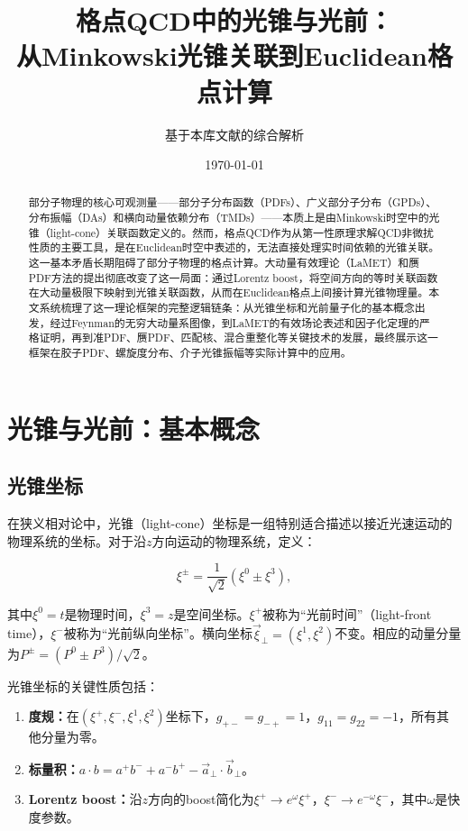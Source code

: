 \documentclass[12pt,a4paper]{ctexart}
\title{\heiti 格点QCD中的光锥与光前：\\
从Minkowski光锥关联到Euclidean格点计算}
\author{基于本库文献的综合解析}
\date{\today}
\theoremstyle{definition}
\begin{document}
\maketitle

\begin{abstract}
\noindent
部分子物理的核心可观测量——部分子分布函数（PDFs）、广义部分子分布（GPDs）、分布振幅（DAs）和横向动量依赖分布（TMDs）——本质上是由Minkowski时空中的光锥（light-cone）关联函数定义的。然而，格点QCD作为从第一性原理求解QCD非微扰性质的主要工具，是在Euclidean时空中表述的，无法直接处理实时间依赖的光锥关联。这一基本矛盾长期阻碍了部分子物理的格点计算。大动量有效理论（LaMET）和赝PDF方法的提出彻底改变了这一局面：通过Lorentz boost，将空间方向的等时关联函数在大动量极限下映射到光锥关联函数，从而在Euclidean格点上间接计算光锥物理量。本文系统梳理了这一理论框架的完整逻辑链条：从光锥坐标和光前量子化的基本概念出发，经过Feynman的无穷大动量系图像，到LaMET的有效场论表述和因子化定理的严格证明，再到准PDF、赝PDF、匹配核、混合重整化等关键技术的发展，最终展示这一框架在胶子PDF、螺旋度分布、介子光锥振幅等实际计算中的应用。
\end{abstract}

\tableofcontents
\newpage

\section{光锥与光前：基本概念}

\subsection{光锥坐标}

在狭义相对论中，光锥（light-cone）坐标是一组特别适合描述以接近光速运动的物理系统的坐标。对于沿$z$方向运动的物理系统，定义\cite{Ji2014LaMET}：

\begin{equation}
\xi^\pm = \frac{1}{\sqrt{2}}(\xi^0 \pm \xi^3),
\label{eq:lightcone_coords}
\end{equation}

其中$\xi^0 = t$是物理时间，$\xi^3 = z$是空间坐标。$\xi^+$被称为``光前时间''（light-front time），$\xi^-$被称为``光前纵向坐标''。横向坐标$\vec{\xi}_\perp = (\xi^1, \xi^2)$不变。相应的动量分量为$P^\pm = (P^0 \pm P^3)/\sqrt{2}$。

光锥坐标的关键性质包括\cite{Ji2014LaMET}：

\begin{enumerate}
    \item \textbf{度规：}在$(\xi^+, \xi^-, \xi^1, \xi^2)$坐标下，$g_{+-} = g_{-+} = 1$，$g_{11} = g_{22} = -1$，所有其他分量为零。
    \item \textbf{标量积：}$a \cdot b = a^+ b^- + a^- b^+ - \vec{a}_\perp \cdot \vec{b}_\perp$。
    \item \textbf{Lorentz boost：}沿$z$方向的boost简化为$\xi^+ \to e^{\omega}\xi^+$，$\xi^- \to e^{-\omega}\xi^-$，其中$\omega$是快度参数。
\end{enumerate}
\end{document}

